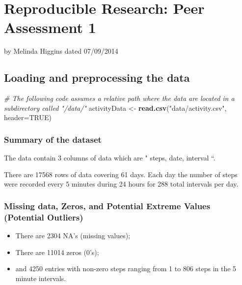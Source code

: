 \documentclass[]{article}
\author{}
\date{}
\newenvironment{Shaded}{\begin{snugshade}}{\end{snugshade}}
\newcommand{\KeywordTok}[1]{\textcolor[rgb]{0.13,0.29,0.53}{\textbf{{#1}}}}
\newcommand{\DataTypeTok}[1]{\textcolor[rgb]{0.13,0.29,0.53}{{#1}}}
\newcommand{\StringTok}[1]{\textcolor[rgb]{0.31,0.60,0.02}{{#1}}}
\newcommand{\CommentTok}[1]{\textcolor[rgb]{0.56,0.35,0.01}{\textit{{#1}}}}
\newcommand{\OtherTok}[1]{\textcolor[rgb]{0.56,0.35,0.01}{{#1}}}
\newcommand{\NormalTok}[1]{{#1}}
\begin{document}
\begin{center}
\normalsize
\end{center}


{
\hypersetup{linkcolor=black}
\setcounter{tocdepth}{2}
\tableofcontents
}
\section{Reproducible Research: Peer Assessment
1}\label{reproducible-research-peer-assessment-1}

by Melinda Higgins dated 07/09/2014

\subsection{Loading and preprocessing the
data}\label{loading-and-preprocessing-the-data}

\begin{Shaded}
\begin{Highlighting}[]
\CommentTok{# The following code assumes a relative path where the data are located in a subdirectory called "/data/"}
\NormalTok{activityData <-}\StringTok{ }\KeywordTok{read.csv}\NormalTok{(}\StringTok{"data/activity.csv"}\NormalTok{, }\DataTypeTok{header=}\OtherTok{TRUE}\NormalTok{)}
\end{Highlighting}
\end{Shaded}

\subsubsection{Summary of the dataset}\label{summary-of-the-dataset}

The data contain 3 columns of data which are " steps, date, interval ``.

There are 17568 rows of data covering 61 days. Each day the number of
steps were recorded every 5 minutes during 24 hours for 288 total
intervals per day.

\subsubsection{Missing data, Zeros, and Potential Extreme Values
(Potential
Outliers)}\label{missing-data-zeros-and-potential-extreme-values-potential-outliers}

\begin{itemize}
\itemsep1pt\parskip0pt
\item
  There are 2304 NA's (missing values);
\item
  There are 11014 zeros (0's);
\item
  and 4250 entries with non-zero steps ranging from 1 to 806 steps in
  the 5 minute intervals.
\end{itemize}
\end{document}
